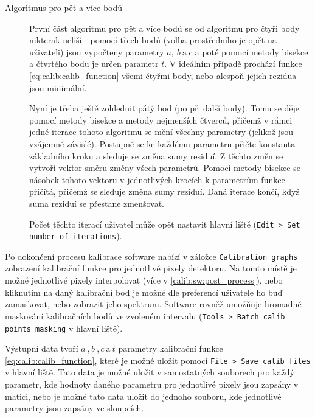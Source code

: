 \begin{description}
	\item[Algoritmus pro pět a více bodů]
	První část algoritmu pro pět a více bodů se od algoritmu pro čtyři body nikterak neliší - pomocí třech bodů (volba prostředního je opět na uživateli) jsou vypočteny parametry $a,~b~\text{a}~c$ a poté pomocí metody bisekce a čtvrtého bodu je určen parametr $t$. V ideálním případě prochází funkce \ref{eq:calib:calib_function} všemi čtyřmi body, nebo alespoň jejich rezidua jsou minimální. 

	Nyní je třeba ještě zohlednit pátý bod (po př. další body). Tomu se děje pomocí metody bisekce a metody nejmenších čtverců, přičemž v rámci jedné iterace tohoto algoritmu se mění všechny parametry (jelikož jsou vzájemně závislé). Postupně se ke každému parametru přičte konstanta základního kroku a sleduje se změna sumy residuí. Z těchto změn se vytvoří vektor směru změny všech parametrů. Pomocí metody bisekce se násobek tohoto vektoru v jednotlivých krocích k parametrům funkce přičítá, přičemž se sleduje změna sumy reziduí. Daná iterace končí, když suma reziduí se přestane zmenšovat.

	Počet těchto iterací uživatel může opět nastavit hlavní liště (\texttt{Edit > Set number of iterations}).

\end{description}

Po dokončení procesu kalibrace software nabízí v záložce \texttt{Calibration graphs} zobrazení kalibrační funkce pro jednotlivé pixely detektoru. Na tomto místě je možné jednotlivé pixely interpolovat (více v \ref{calib:sw:post_process}), nebo kliknutím na daný kalibrační bod je možné dle preferencí uživatele ho buď zamaskovat, nebo zobrazit jeho spektrum. Software rovněž umožňuje hromadné maskování kalibračních bodů ve zvoleném intervalu (\texttt{Tools > Batch calib points masking} v hlavní liště).

Výstupní data tvoří $a~,b~,c~\text{a}~t$ parametry kalibrační funkce \ref{eq:calib:calib_function}, které je možné uložit pomocí \texttt{File > Save calib files} v hlavní liště. Tato data je možné uložit v samostatných souborech pro každý parametr, kde hodnoty daného parametru pro jednotlivé pixely jsou zapsány v matici, nebo je možné tato data uložit do jednoho souboru, kde jednotlivé parametry jsou zapsány ve sloupcích.


